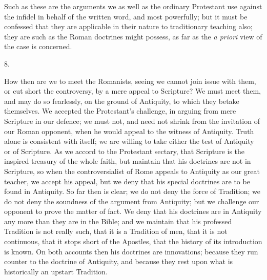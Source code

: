 Such as these are the arguments we as well as the ordinary
Protestant use against the infidel in behalf of the written word, and
most powerfully; but it must be confessed that they are applicable in
their nature to traditionary teaching also; they are such as the Roman
doctrines might possess, as far as the \emph{a priori} view of the
case is concerned.

8.

How then are we to meet the Romanists, seeing we cannot join issue
with them, or cut short the controversy, by a mere appeal to
Scripture? We must meet them, and may do so fearlessly, on the ground
of Antiquity, to which they betake themselves. We accepted the
Protestant's challenge, in arguing from mere Scripture in our defence;
we must not, and need not shrink from the invitation of our Roman
opponent, when he would appeal to the witness of Antiquity. Truth
alone is consistent with itself; we are willing to take either the
test of Antiquity or of Scripture. As we accord to the Protestant
sectary, that Scripture is the inspired treasury of the whole faith,
but maintain that his doctrines are not in Scripture, so when the
controversialist of Rome appeals to Antiquity as our great teacher, we
accept his appeal, but we deny that his special doctrines are to be
found in Antiquity. So far then is clear; we do not deny the force of
Tradition; we do not deny the soundness of the argument from
Antiquity; but we challenge our opponent to prove the matter of fact.
We deny that his doctrines are in Antiquity any more than they are in
the Bible; and we maintain that his professed Tradition is not really
such, that it is a Tradition of men, that it is not continuous, that
it stops short of the Apostles, that the history of its
introduction is known. On both accounts then his doctrines are
innovations; because they run counter to the doctrine of Antiquity,
and because they rest upon what is historically an upstart Tradition.

